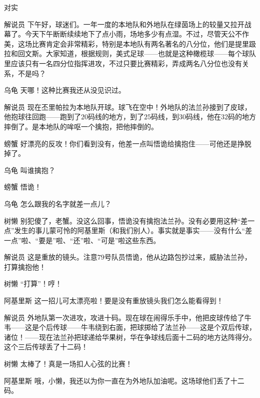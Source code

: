 \begin{dialog}{对实}
\begin{dialogue}
\item[解说员]下午好，球迷们。一年一度的本地队和外地队在绿茵场上的较量又拉开战幕了。今天下午断断续续地下了点小雨，场地多少有点湿。不过，尽管天公不作美，这场比赛肯定会非常精彩，特别是本地队有两名著名的八分位，他们是提里趿拉和回文斯。大家知道，根据规则，美式足球——也就是这种橄榄球——每个球队里应该只有一名四分位指挥进攻，不过只要比赛精彩，弄成两名八分位也没有关系，不是吗？

\item[乌龟]天哪！这种比赛我还从没见识过。

\item[解说员]现在丕里帕拉为本地队开球。球飞在空中！外地队的法兰孙接到了皮球，他抱球往回跑——跑到了$20$码线的地方，到了$25$码线，到$30$码线，他在$32$码的地方摔倒了。是本地队的哞呕一个擒抱，把他摔倒的。

\item[螃蟹]好漂亮的反攻！你们看到没有，他差一点叫悟诡给擒抱住——可他还是挣脱掉了。

\item[乌龟]叫谁擒抱？

\item[螃蟹]悟诡！

\item[乌龟]怎么跟我的名字就差一点儿？

\item[树懒]别犯傻了，老蟹。没这么回事，悟诡没有擒抱法兰孙。没有必要用这种“差一点”发生的事儿蒙可怜的阿基里斯（和我们别人）。事实就是事实——没有什么“差一点”啦、“要是”啦、“还”啦、“可是”啦这些东西。

\item[解说员]这是重放的镜头。注意$79$号队员悟诡，他从边路包抄过来，威胁法兰孙，打算擒抱他！

\item[树懒]“打算”！哼！

\item[阿基里斯]这一招儿可太漂亮啦！要是没有重放镜头我们怎么能看得到！

\item[解说员]外地队第一次进攻，攻进十码。现在球在闹得乐手中，他把皮球传给了牛韦——这是个后传球——牛韦绕到右面，把球掷给了法兰孙——这是个双后传球，诸位！——现在法兰孙把球递给华果树，华在争球线后面十二码的地方达阵得分。这个三后传球丢了十二码！

\item[树懒]太棒了！真是一场扣人心弦的比赛！

\item[阿基里斯]哦，小懒，我还以为你一直在为外地队加油呢。这场球他们丢了十二码。


\end{dialogue}
\end{dialog}
